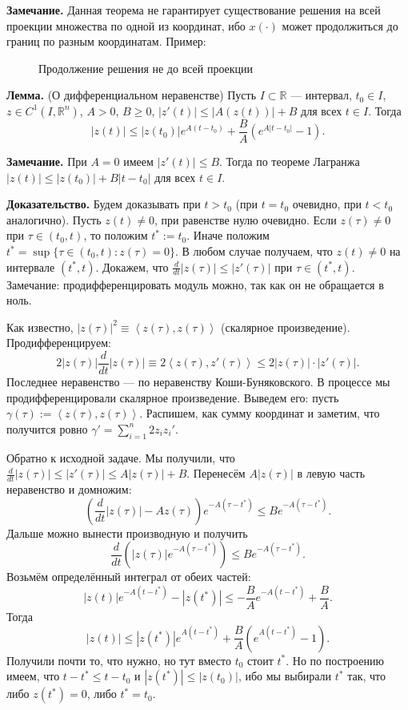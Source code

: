 \QED

\textbf{Замечание.} Данная теорема не гарантирует существование решения на всей проекции множества по одной из координат, ибо $x(\cdot)$ может продолжиться до границ по разным координатам.
Пример:

\begin{figure}[ht]
    \centering
    \caption{Продолжение решения не до всей проекции}
\end{figure}

\textbf{Лемма.} (О дифференциальном неравенстве) Пусть $I \subset \mathbb R$ --- интервал, $t_0 \in I$, $z \in C^1(I, \mathbb R^n)$, $A > 0$, $B \ge 0$, $|z'(t)| \le |A(z(t))| + B$ для всех $t \in I$.
Тогда
\[
    |z(t)| \le |z(t_0)|e^{A(t - t_0)} + \frac{B}{A} \left( e^{A|t - t_0|} - 1 \right).
\]

\textbf{Замечание.} При $A = 0$ имеем $|z'(t)| \le B$. Тогда по теореме Лагранжа $|z(t)| \le |z(t_0)| + B|t - t_0|$ для всех $t \in I$.

\textbf{Доказательство.} Будем доказывать при $t > t_0$ (при $t = t_0$ очевидно, при $t < t_0$ аналогично).
Пусть $z(t) \ne 0$, при равенстве нулю очевидно.
Если $z(\tau) \ne 0$ при $\tau \in (t_0, t)$, то положим $t^* := t_0$.
Иначе положим $t^* = \sup \{\tau \in (t_0, t): z(\tau) = 0\}$.
В любом случае получаем, что $z(t) \ne 0$ на интервале $(t^*, t)$.
Докажем, что $\frac{d}{d t} |z(\tau)| \le |z'(\tau)|$ при $\tau \in (t^*, t)$.
Замечание: продифференцировать модуль можно, так как он не обращается в ноль.

Как известно, $|z(\tau)|^2 \equiv \left< z(\tau), z(\tau) \right>$ (скалярное произведение).
Продифференцируем:
\[
    2|z(\tau)| \frac{d}{dt} |z(\tau)| \equiv 2 \left< z(\tau), z'(\tau) \right> \le 2|z(\tau)| \cdot |z'(\tau)|.
\]
Последнее неравенство --- по неравенству Коши-Буняковского.
В процессе мы продифференцировали скалярное произведение. Выведем его: пусть $\gamma(\tau) := \left< z(\tau), z(\tau) \right>$.
Распишем, как сумму координат и заметим, что получится ровно $\gamma' = \sum_{i=1}^{n} 2z_iz_i'$.

Обратно к исходной задаче. Мы получили, что $\frac{d}{dt} |z(\tau)| \le |z'(\tau)| \le A|z(\tau)| + B$.
Перенесём $A|z(\tau)|$ в левую часть неравенство и домножим:
\[
    \left(\frac{d}{dt} |z(\tau)| - Az(\tau) \right) e^{-A(\tau - t^*)} \le Be^{-A(\tau - t^*)}.
\]
Дальше можно вынести производную и получить
\[
    \frac{d}{dt} \left( |z(\tau)| e^{-A(\tau - t^*)} \right) \le Be^{-A(\tau - t^*)}.
\]
Возьмём определённый интеграл от обеих частей:
\[
    |z(t)| e^{-A(t - t^*)} - |z(t^*)| \le -\frac{B}{A} e^{-A(t - t^*)} + \frac{B}{A}.
\]
Тогда
\[
    |z(t)| \le |z(t^*)| e^{A(t - t^*)} + \frac{B}{A} \left( e^{A(t - t^*)} - 1 \right).
\]
Получили почти то, что нужно, но тут вместо $t_0$ стоит $t^*$.
Но по построению имеем, что $t - t^* \le t - t_0$ и $|z(t^*)| \le |z(t_0)|$, ибо мы выбирали $t^*$ так, что либо $z(t^*) = 0$, либо $t^* = t_0$.

